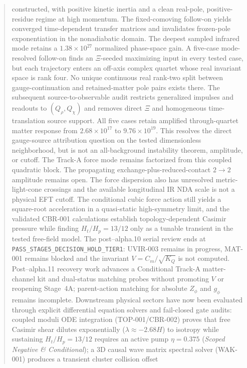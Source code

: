 \documentclass[11pt]{article}
\begin{document}
\begin{abstract}
constructed, with positive kinetic inertia and a clean real-pole,
positive-residue regime at high momentum.  The fixed-comoving follow-on yields
converged time-dependent transfer matrices and invalidates frozen-pole
exponentiation in the nonadiabatic domain.  The deepest sampled infrared mode
retains a $1.38\times10^{27}$ normalized phase-space gain.  A five-case
mode-resolved follow-on finds an $\Xi$-seeded maximizing input in every tested
case, but each trajectory enters an off-axis complex quartet whose real
invariant space is rank four.  No unique continuous real rank-two split
between gauge-continuation and retained-matter pole pairs exists there.  The
subsequent source-to-observable audit restricts generalized impulses and
readouts to $(Q_\rho,Q_\chi)$ and removes direct $\Xi$ and homogeneous
time-translation source support.  All five cases retain amplified
through-quartet matter response from $2.68\times10^{17}$ to
$9.76\times10^{19}$.  This resolves the direct gauge-source attribution
question on the tested dimensionless neighborhood, but is not an
all-background instability theorem, amplitude, or cutoff.  The Track-A force
mode remains factorized from this coupled quadratic block.  The propagating
exchange-plus-reduced-contact $2\to2$ amplitude remains open.  The
force dispersion also has
unresolved metric-light-cone crossings and the available longitudinal IR NDA
scale is not a physical EFT cutoff.  The conditional cubic force action still
yields a
square-root acceleration in a quasi-static high-symmetry limit, and the
validated CBR-001 calculations establish topology-dependent Casimir pressure
while finding $H_t/H_p=13/12$ only as a tunable transient in the tested
free-field model.  The post--alpha.10 serial review ends at
\texttt{PASS\_STAGE5\_DECISION\_HOLD\_TIER1}: UVIR-003 remains in progress,
MAT-001 remains blocked and the invariant $V=C_m/\sqrt{K_Q}$ is not computed.
Post--alpha.11 recovery work advances a Conditional Track-A matter-channel
kit and dual-status matching probes without promoting $V$ or reopening
Stage~4A; parent-action matching for absolute $Z_\phi$ and $g_\phi$ remains
incomplete. Downstream physical sectors have now been evaluated through explicit
differential equation solvers and fail-closed gate audits:
coupled moduli ODE integration (TOP-001/CBR-002) proves that free Casimir shear dilutes
exponentially ($\lambda \approx -2.68H$) to isotropy while sustaining $H_t/H_p = 13/12$
requires an active pump $\eta = 0.375$ (\textit{Scoped Negative \& Conditional});
a 3D causal wave matrix spectral solver (WAK-001) produces a transient cluster collision offset

\end{abstract}
\end{document}
